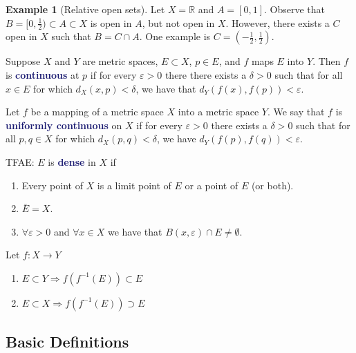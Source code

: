 \documentclass[11pt]{article}
\numberwithin{equation}{section}
\newcommand{\navy}[1]{\textcolor{MidnightBlue}{\bf #1}}
\theoremstyle{definition}
\theoremstyle{definition}
\newtheorem{example}{\color{WildStrawberry}Example}[section]
\newcommand\inv[1]{#1^{-1}}
\def\imp{\Rightarrow}
\newcommand{\1}{\mathbbm 1}
\def\d{\delta}
\newcommand{\e}{\varepsilon}
\newcommand{\RR}{\mathbb R}
\begin{document}
\begin{example}[Relative open sets]
	Let $X = \RR$ and $A = [0,1]$. Observe that $B = [0,\frac{1}{2}) \subset A \subset X$ is open in $A$, but not open in $X$. However, there exists a $C$ open in $X$ such that $B = C \cap A$. One example is $C = (-\frac{1}{2}, \frac{1}{2})$.
\end{example}	


\begin{definition}[Continuous]
	Suppose $X$ and $Y$ are metric spaces, $E \subset X$, $p \in E$, and $f$ maps $E$ into $Y$. Then $f$ is \navy{continuous} at $p$ if for every $\e > 0$ there there exists a $\d > 0$ such that for all $x \in E$ for which $d_X(x,p) < \d$, we have that $d_Y(f(x), f(p)) < \e$. 
\end{definition}

\begin{definition}
	Let $f$ be a mapping of a metric space $X$ into a metric space $Y$. We say that $f$ is \navy{uniformly continuous} on $X$ if for every $\e > 0$ there exists a $\d > 0$ such that for all $p,q \in X$ for which $d_X(p,q) < \delta$, we have $d_Y(f(p),f(q)) < \e$. 
\end{definition}

\begin{definition}[Dense] TFAE: $E$ is \navy{dense} in $X$ if
\begin{enumerate}
	\item  Every point of $X$ is a limit point of $E$ or a point of $E$ (or both). 
	\item $\bar{E} = X$.
	\item $\forall \e > 0$ and $\forall x \in X$ we have that $B(x,\e) \cap E \neq \emptyset$.
\end{enumerate} 
\end{definition}

\begin{theorem}
	Let $f: X \to Y$
	\begin{enumerate}
		\item $E \subset Y \imp f(\inv{f}(E)) \subset E$ 
		\item $E \subset X \imp f(\inv{f}(E)) \supset E$
	\end{enumerate}
\end{theorem}



\subsection{Basic Definitions}
\end{document}
